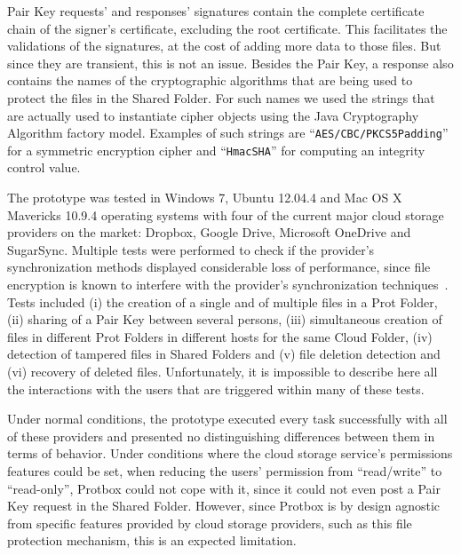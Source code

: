 \documentclass[english]{lni}
\newcommand\protbox{Protbox}
\newcommand\ProtF{Prot Folder}
\newcommand\ProtFs{Prot Folders}
\newcommand\SharedF{Shared Folder}
\newcommand\SharedFs{Shared Folders}
\newcommand\CloudF{Cloud Folder}
\newcommand\PairKey{Pair Key}
\begin{document}
{\PairKey} requests' and responses' signatures contain the complete
certificate chain of the signer's certificate, excluding the root
certificate. This facilitates the validations of the signatures, at
the cost of adding more data to those files. But since they are
transient, this is not an issue. Besides the {\PairKey}, a response
also contains the names of the cryptographic algorithms that are being
used to protect the files in the {\SharedF}.  For such names we
used the strings that are actually used to instantiate cipher
objects using the Java Cryptography Algorithm factory model.
Examples of such strings are ``\texttt{AES/CBC/PKCS5Padding}'' for a
symmetric encryption cipher and ``\texttt{HmacSHA}'' for computing
an integrity control value.



The prototype was tested in Windows 7, Ubuntu 12.04.4 and Mac OS X 
Mavericks 10.9.4 operating systems with four of the 
current major cloud storage providers on the market: Dropbox, 
Google Drive, Microsoft OneDrive and SugarSync. Multiple tests were
performed to check if the provider's synchronization methods
displayed considerable loss of performance, since file encryption
is known to interfere with the provider's synchronization
techniques~\cite{tests}. Tests included (i) the creation of a single and of
multiple files in a {\ProtF},
(ii) sharing of a {\PairKey} between several persons, (iii) simultaneous creation
of files in different {\ProtFs} in different hosts for the same {\CloudF}, (iv) detection of tampered files in {\SharedFs}
and (v) file deletion detection and (vi) recovery of deleted files.
Unfortunately, it is impossible to describe here all the interactions
with the users that are triggered within many of these tests.

Under normal conditions, the prototype executed every task
successfully with all of these providers and presented no
distinguishing differences between them in terms of behavior. Under
conditions where the cloud storage service's permissions features
could be set, when reducing the users' permission from ``read/write'' to
``read-only'', {\protbox} could not cope with it, since it could not
even post a {\PairKey} request in the {\SharedF}. However, since
{\protbox} is by design agnostic from specific features provided
by cloud storage providers, such as this file protection mechanism, this is an expected limitation.
\end{document}
